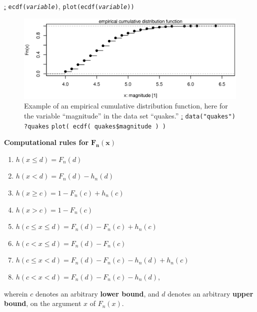 \medskip
\noindent
\underline{\R:} \texttt{ecdf(\textit{variable})},
\texttt{plot(ecdf(\textit{variable}))}

%
\begin{figure}[!htb]
\begin{flushleft}
\includegraphics[scale=0.8]{empiricalcdf.eps}
\end{flushleft}
\caption{Example of an empirical cumulative distribution function,
here for the variable ``magnitude'' in the \R{} data set
``quakes.'' \newline
\underline{\R:} \newline
\texttt{data("quakes")} \newline
\texttt{?quakes} \newline
\texttt{plot( ecdf( quakes\$magnitude ) )}}
\end{figure}
%

\medskip
\noindent
\textbf{Computational rules for} $\boldsymbol{F_{n}(x)}$

%
\begin{enumerate}
\item $h(x \leq d) = F_{n}(d)$
\item $h(x < d) = F_{n}(d) - h_{n}(d)$
\item $h(x \geq c) = 1 - F_{n}(c) + h_{n}(c)$
\item $h(x > c) =  1- F_{n}(c)$
\item $h(c \leq x \leq d) = F_{n}(d) - F_{n}(c) + h_{n}(c)$
\item $h(c < x \leq d) = F_{n}(d) - F_{n}(c)$
\item $h(c \leq x < d) = F_{n}(d) - F_{n}(c) - h_{n}(d)
+ h_{n}(c)$
\item $h(c < x < d) = F_{n}(d) - F_{n}(c) - h_{n}(d)$,
\end{enumerate}
%
wherein $c$ denotes an arbitrary \textbf{lower bound}, and $d$ 
denotes an arbitrary \textbf{upper bound}, on the argument $x$ of 
$F_{n}(x)$.

